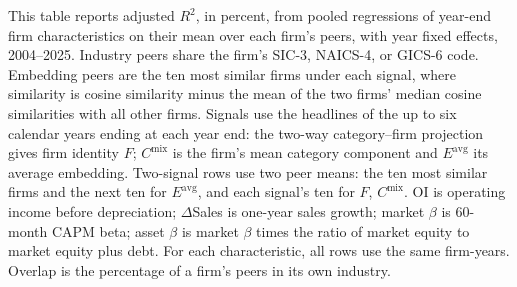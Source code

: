 \begin{table}[htbp]
\centering
\caption{Firm Networks and Industry Classifications}
\label{tab:tab5}
\begin{minipage}{\linewidth}\footnotesize
This table reports adjusted $R^2$, in percent, from pooled regressions of year-end firm characteristics on their mean over each firm's peers, with year fixed effects, 2004--2025. Industry peers share the firm's SIC-3, NAICS-4, or GICS-6 code. Embedding peers are the ten most similar firms under each signal, where similarity is cosine similarity minus the mean of the two firms' median cosine similarities with all other firms. Signals use the headlines of the up to six calendar years ending at each year end: the two-way category--firm projection gives firm identity $F$; $C^{\mathrm{mix}}$ is the firm's mean category component and $E^{\mathrm{avg}}$ its average embedding. Two-signal rows use two peer means: the ten most similar firms and the next ten for $E^{\mathrm{avg}}$, and each signal's ten for $F$, $C^{\mathrm{mix}}$. OI is operating income before depreciation; $\Delta$Sales is one-year sales growth; market $\beta$ is 60-month CAPM beta; asset $\beta$ is market $\beta$ times the ratio of market equity to market equity plus debt. For each characteristic, all rows use the same firm-years. Overlap is the percentage of a firm's peers in its own industry.
\end{minipage}
\medskip


\end{table}
